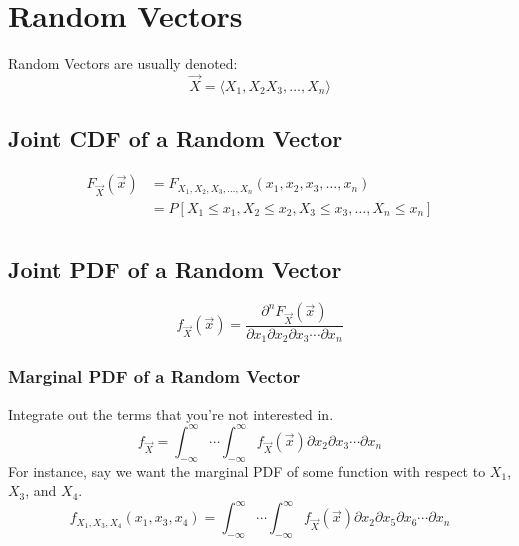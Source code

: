 \section{Random Vectors} \label{sec:Random Vectors}
Random Vectors are usually denoted:
	\begin{equation} \label{eq:Random Vector Notation}
		\vec{X} = \langle X_{1}, X_{2} X_{3}, \ldots, X_{n} \rangle
	\end{equation}
	
	\subsection{Joint CDF of a Random Vector} \label{subsec:Joint CDF of Random Vector}
		\begin{equation} \label{eq:Joint CDF of Random Vector}
			\begin{aligned}
				F_{\vec{X}} \left( \vec{x} \right) 
					&= F_{X_{1}, X_{2}, X_{3}, \ldots, X_{n}} \left( x_{1}, x_{2}, x_{3}, \ldots, x_{n} \right) \\
					&= P \left[ X_{1} \leq x_{1}, X_{2} \leq x_{2}, X_{3} \leq x_{3}, \ldots, X_{n} \leq x_{n} \right] \\
			\end{aligned}
		\end{equation}
		
	\subsection{Joint PDF of a Random Vector} \label{subsec:Joint PDF of Random Vector}
		\begin{equation} \label{eq:Joint PDF of Random Vector}
			f_{\vec{X}} \left( \vec{x} \right) = \frac{\partial^{n} F_{\vec{X}} \left( \vec{x} \right)}{\partial x_{1} \partial x_{2} \partial x_{3} \cdots \partial x_{n}}
		\end{equation}
		
		\subsubsection{Marginal PDF of a Random Vector} \label{subsubsec:Marginal PDF of Random Vector}
		Integrate out the terms that you're not interested in.
		\begin{equation} \label{eq:Marginal PDF of Random Vector}
			f_{\vec{X}} = \int_{-\infty}^{\infty} \cdots \int_{-\infty}^{\infty} f_{\vec{X}} \left( \vec{x} \right) \partial x_{2} \partial x_{3} \cdots \partial x_{n}
		\end{equation}
		For instance, say we want the marginal PDF of some function with respect to $X_{1}$, $X_{3}$, and $X_{4}$.
		\begin{equation} \label{eq:Marginal PDF of Random Vector Multiple Variables}
			f_{X_{1}, X_{3}, X_{4}} \left( x_{1}, x_{3}, x_{4} \right) = \int_{-\infty}^{\infty} \cdots \int_{-\infty}^{\infty} f_{\vec{X}} \left( \vec{x} \right) \partial x_{2} \partial x_{5} \partial x_{6} \cdots \partial x_{n}
		\end{equation}